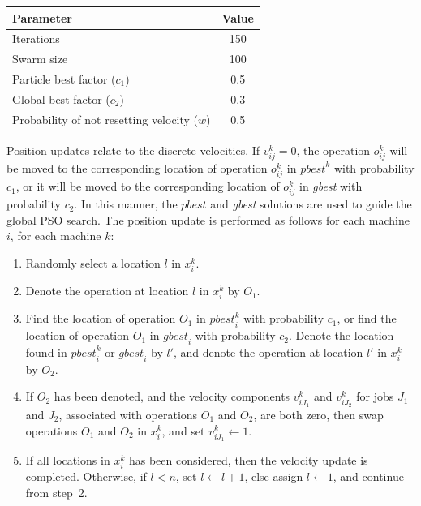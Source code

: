 \documentclass[paper=a4, fontsize=9pt]{scrartcl}
\begin{document}
\begin{multicols}{2}
{
\vspace{0.2cm}
\begin{minipage}{\linewidth{}}
\centering
\begin{tabular}{lc}
\toprule
Parameter                                   & Value \\
\midrule
Iterations                                  & 150   \\
Swarm size                                  & 100   \\
Particle best factor ($c_1$)                &   0.5 \\
Global best factor ($c_2$)                  &   0.3 \\
Probability of not resetting velocity ($w$) &   0.5 \\
\bottomrule
\end{tabular}
\vspace{-0.2cm}
\label{table:psoparams}
\end{minipage}
}

Position updates relate to the discrete velocities. If $v_{ij}^k=0$, the operation $o_{ij}^k$ will be moved to the corresponding location of operation $o_{ij}^k$ in $\textit{pbest}^k$ with probability $c_1$, or it will be moved to the corresponding location of $o_{ij}^k$ in \textit{gbest} with probability $c_2$. In this manner, the $\textit{pbest}$ and \textit{gbest} solutions are used to guide the global \ac{PSO} search. The position update is performed as follows for each machine $i$, for each machine $k$:

\begin{enumerate}
    \item Randomly select a location $l$ in $x_i^k$.
    \item Denote the operation at location $l$ in $x_i^k$ by $O_1$.
    \item Find the location of operation $O_1$ in $\textit{pbest}_i^k$ with probability $c_1$, or find the location of operation $O_1$ in $\textit{gbest}_i$ with probability $c_2$. Denote the location found in $\textit{pbest}_i^k$ or $\textit{gbest}_i$ by $l'$, and denote the operation at location $l'$ in $x_i^k$ by $O_2$.
    \item If $O_2$ has been denoted, and the velocity components $v_{i{J_1}}^k$ and $v_{i{J_2}}^k$ for jobs $J_1$ and $J_2$, associated with operations $O_1$ and $O_2$, are both zero, then swap operations $O_1$ and $O_2$ in $x_i^k$, and set $v_{i{J_1}}^k \gets 1$.
    \item If all locations in $x_i^k$ has been considered, then the velocity update is completed. Otherwise, if $l<n$, set $l \gets l+1$, else assign $l \gets 1$, and continue from step~2.
\end{enumerate}


\end{multicols}
\end{document}
